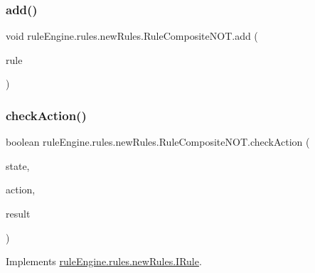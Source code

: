 \subsubsection{\texorpdfstring{add()}{add()}}
{\footnotesize\ttfamily void rule\+Engine.\+rules.\+new\+Rules.\+Rule\+Composite\+N\+O\+T.\+add (\begin{DoxyParamCaption}\item[{\mbox{\hyperlink{interfacerule_engine_1_1rules_1_1new_rules_1_1_i_rule}{I\+Rule}}}]{rule }\end{DoxyParamCaption})\hspace{0.3cm}{\ttfamily [inline]}}

\mbox{\label{classrule_engine_1_1rules_1_1new_rules_1_1_rule_composite_n_o_t_a58fe12e7cdc5cdcff6d0df2c67ecedb8}} 
\subsubsection{\texorpdfstring{check\+Action()}{checkAction()}}
{\footnotesize\ttfamily boolean rule\+Engine.\+rules.\+new\+Rules.\+Rule\+Composite\+N\+O\+T.\+check\+Action (\begin{DoxyParamCaption}\item[{\mbox{\hyperlink{classgame_1_1game_state_1_1_game_state}{Game\+State}}}]{state,  }\item[{\mbox{\hyperlink{classrule_engine_1_1_game_action}{Game\+Action}}}]{action,  }\item[{\mbox{\hyperlink{classrule_engine_1_1_rule_result}{Rule\+Result}}}]{result }\end{DoxyParamCaption})\hspace{0.3cm}{\ttfamily [inline]}}



Implements \mbox{\hyperlink{interfacerule_engine_1_1rules_1_1new_rules_1_1_i_rule_a72ce29a47d7a5fba75a09444a50a481e}{rule\+Engine.\+rules.\+new\+Rules.\+I\+Rule}}.

